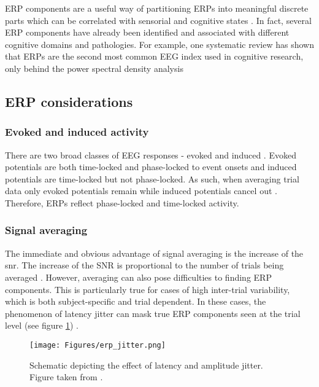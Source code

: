 ERP components are a useful way of partitioning ERPs into meaningful discrete parts which can be correlated with sensorial and cognitive states \cite{kappenmanERPComponentsUps2011}. In fact, several ERP components have already been identified and associated with different cognitive domains and pathologies. For example, one systematic review has shown that ERPs are the second most common EEG index used in cognitive research, only behind the power spectral density analysis \cite{donoghueAutomatedMetaanalysisEventrelated2022, ismailApplicationsEEGIndices2020}

\subsection{ERP considerations}

\subsubsection{Evoked and induced activity}

There are two broad classes of EEG responses - evoked and induced \cite{cohenAnalyzingNeuralTime2014}. Evoked potentials are both time-locked and phase-locked to event onsets and induced potentials are time-locked but not phase-locked. As such, when averaging trial data only evoked potentials remain while induced potentials cancel out \cite{luckIntroductionEventrelatedPotential2014, makeigAuditoryEventrelatedDynamics1993a}. Therefore, ERPs reflect phase-locked and time-locked activity.


\subsubsection{Signal averaging}

The immediate and obvious advantage of signal averaging is the increase of the \acrfull{snr}. The increase of the SNR is proportional to the number of trials being averaged \cite{luckIntroductionEventrelatedPotential2014}. However, averaging can also pose difficulties to finding ERP components. This is particularly true for cases of high inter-trial variability, which is both subject-specific and trial dependent. In these cases, the phenomenon of latency jitter can mask true ERP components seen at the trial level (see figure \ref{fig:erp_jitter}) \cite{luckOxfordHandbookEventrelated2013,murrayCompensationTrialtoTrialLatency2019}. 

\begin{figure}[H]
	\centering
	\texttt{[image: Figures/erp\_jitter.png]}
	\caption{Schematic depicting the effect of latency and amplitude jitter. Figure taken from \cite{murrayCompensationTrialtoTrialLatency2019}. \label{fig:erp_jitter}}
\end{figure}

